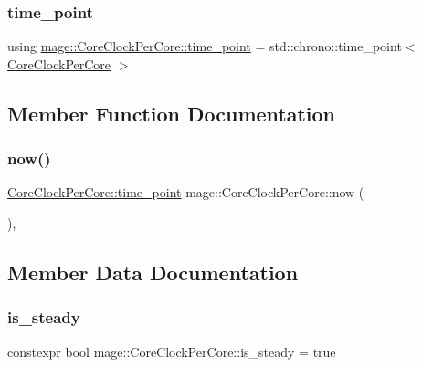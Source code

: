 \hypertarget{structmage_1_1_core_clock_per_core_ab37b1036bb4697f16dd5dee6f169e7c3}{}\label{structmage_1_1_core_clock_per_core_ab37b1036bb4697f16dd5dee6f169e7c3} 
\subsubsection{\texorpdfstring{time\+\_\+point}{time\_point}}
{\footnotesize\ttfamily using \hyperlink{structmage_1_1_core_clock_per_core_ab37b1036bb4697f16dd5dee6f169e7c3}{mage\+::\+Core\+Clock\+Per\+Core\+::time\+\_\+point} =  std\+::chrono\+::time\+\_\+point$<$ \hyperlink{structmage_1_1_core_clock_per_core}{Core\+Clock\+Per\+Core} $>$}



\subsection{Member Function Documentation}
\hypertarget{structmage_1_1_core_clock_per_core_a416a2875f7025a89948f5b75feb3fad9}{}\label{structmage_1_1_core_clock_per_core_a416a2875f7025a89948f5b75feb3fad9} 
\subsubsection{\texorpdfstring{now()}{now()}}
{\footnotesize\ttfamily \hyperlink{structmage_1_1_core_clock_per_core_ab37b1036bb4697f16dd5dee6f169e7c3}{Core\+Clock\+Per\+Core\+::time\+\_\+point} mage\+::\+Core\+Clock\+Per\+Core\+::now (\begin{DoxyParamCaption}{ }\end{DoxyParamCaption})\hspace{0.3cm}{\ttfamily [static]}, {\ttfamily [noexcept]}}



\subsection{Member Data Documentation}
\hypertarget{structmage_1_1_core_clock_per_core_af4be3201fc4c1fc55c37db59143c9865}{}\label{structmage_1_1_core_clock_per_core_af4be3201fc4c1fc55c37db59143c9865} 
\subsubsection{\texorpdfstring{is\+\_\+steady}{is\_steady}}
{\footnotesize\ttfamily constexpr bool mage\+::\+Core\+Clock\+Per\+Core\+::is\+\_\+steady = true\hspace{0.3cm}{\ttfamily [static]}}

